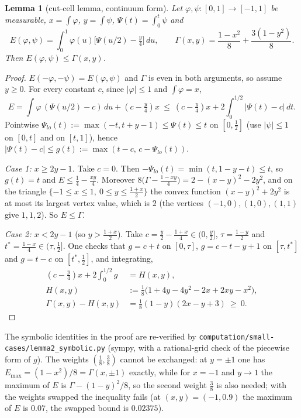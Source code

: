 \documentclass[11pt]{amsart}
\newtheorem{lemma}[theorem]{Lemma}
\theoremstyle{remark}
\begin{document}
\begin{lemma}[cut-cell lemma, continuum form]\label{lem:cut}
Let $\varphi,\psi\colon[0,1]\to[-1,1]$ be measurable, $x=\int\varphi$, $y=\int\psi$, $\Psi(t)=\int_0^t\psi$ and
\[E(\varphi,\psi)=\int_0^1\varphi(u)\bigl[\Psi(u/2)-\tfrac y4\bigr]\,du,\qquad\Gamma(x,y)=\frac{1-x^2}{8}+\frac{3(1-y^2)}{8}.\]
Then $E(\varphi,\psi)\le\Gamma(x,y)$.
\end{lemma}
\begin{proof}
$E(-\varphi,-\psi)=E(\varphi,\psi)$ and $\Gamma$ is even in both arguments, so assume $y\ge0$. For every constant $c$, since $|\varphi|\le1$ and $\int\varphi=x$,
\[E=\int\varphi\,(\Psi(u/2)-c)\,du+(c-\tfrac y4)x\ \le\ (c-\tfrac y4)x+2\int_0^{1/2}|\Psi(t)-c|\,dt.\]
Pointwise $\Psi_{lo}(t):=\max(-t,t+y-1)\le\Psi(t)\le t$ on $[0,\frac12]$ (use $|\psi|\le1$ on $[0,t]$ and on $[t,1]$), hence $|\Psi(t)-c|\le g(t):=\max(t-c,\,c-\Psi_{lo}(t))$.

\emph{Case 1: $x\ge2y-1$.} Take $c=0$. Then $-\Psi_{lo}(t)=\min(t,1-y-t)\le t$, so $g(t)=t$ and $E\le\frac14-\frac{xy}4$.
Moreover $8\bigl(\Gamma-\frac{1-xy}4\bigr)=2-(x-y)^2-2y^2$, and on the triangle $\{-1\le x\le1,\ 0\le y\le\frac{1+x}2\}$ the convex function $(x-y)^2+2y^2$ is at most its largest vertex value, which is $2$ (the vertices $(-1,0),(1,0),(1,1)$ give $1,1,2$). So $E\le\Gamma$.

\emph{Case 2: $x<2y-1$} (so $y>\frac{1+x}2$). Take $c=\frac y2-\frac{1+x}4\in(0,\frac y2]$, $\tau=\frac{1-y}2$ and $t^*=\frac{1-x}4\in(\tau,\frac12]$. One checks that $g=c+t$ on $[0,\tau]$, $g=c-t-y+1$ on $[\tau,t^*]$ and $g=t-c$ on $[t^*,\frac12]$, and integrating,
\begin{align*}
(c-\tfrac y4)x+2\int_0^{1/2}g&=H(x,y),\\
H(x,y)&:=\tfrac18\bigl(1+4y-4y^2-2x+2xy-x^2\bigr),\\
\Gamma(x,y)-H(x,y)&=\tfrac18(1-y)(2x-y+3)\ \ge\ 0.
\end{align*}
\end{proof}
The symbolic identities in the proof are re-verified by \texttt{computation/small-cases/lemma2\_symbolic.py} (sympy, with a rational-grid check of the piecewise form of $g$). The weights $(\frac18,\frac38)$ cannot be exchanged: at $y=\pm1$ one has $E_{\max}=(1-x^2)/8=\Gamma(x,\pm1)$ exactly, while for $x=-1$ and $y\to1$ the maximum of $E$ is $\Gamma-(1-y)^2/8$, so the second weight $\frac38$ is also needed; with the weights swapped the inequality fails (at $(x,y)=(-1,0.9)$ the maximum of $E$ is $0.07$, the swapped bound is $0.02375$).
\end{document}
